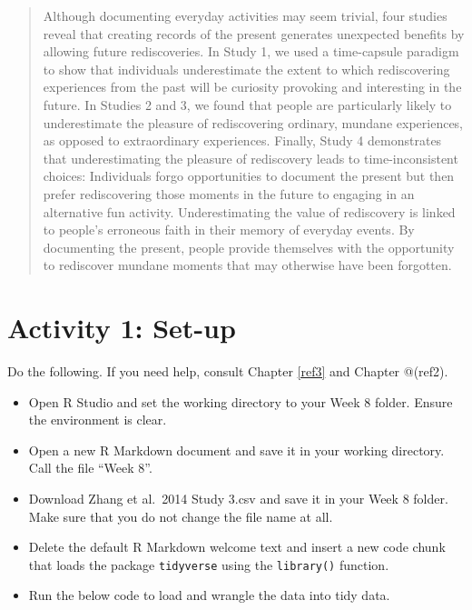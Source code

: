\documentclass[]{book}
\providecommand{\tightlist}{%
  \setlength{\itemsep}{0pt}\setlength{\parskip}{0pt}}
\begin{document}
\begin{quote}
Although documenting everyday activities may seem trivial, four studies reveal that creating records of the present generates unexpected benefits by allowing future rediscoveries. In Study 1, we used a time-capsule paradigm to show that individuals underestimate the extent to which rediscovering experiences from the past will be curiosity provoking and interesting in the future. In Studies 2 and 3, we found that people are particularly likely to underestimate the pleasure of rediscovering ordinary, mundane experiences, as opposed to extraordinary experiences. Finally, Study 4 demonstrates that underestimating the pleasure of rediscovery leads to time-inconsistent choices: Individuals forgo opportunities to document the present but then prefer rediscovering those moments in the future to engaging in an alternative fun activity. Underestimating the value of rediscovery is linked to people's erroneous faith in their memory of everyday events. By documenting the present, people provide themselves with the opportunity to rediscover mundane moments that may otherwise have been forgotten.
\end{quote}

\hypertarget{activity-1-set-up-8}{%
\section{Activity 1: Set-up}\label{activity-1-set-up-8}}

Do the following. If you need help, consult Chapter \ref{ref3} and Chapter @(ref2).

\begin{itemize}
\tightlist
\item
  Open R Studio and set the working directory to your Week 8 folder. Ensure the environment is clear.\\
\item
  Open a new R Markdown document and save it in your working directory. Call the file ``Week 8''.\\
\item
  Download Zhang et al.~2014 Study 3.csv and save it in your Week 8 folder. Make sure that you do not change the file name at all.
\item
  Delete the default R Markdown welcome text and insert a new code chunk that loads the package \texttt{tidyverse} using the \texttt{library()} function.
\item
  Run the below code to load and wrangle the data into tidy data.
\end{itemize}
\end{document}
